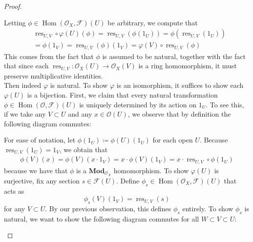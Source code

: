 \documentclass{article}
\newcommand{\fO}{\mathscr{O}}
\newcommand{\fF}{\mathscr{F}}
\DeclareMathOperator{\res}{res}
\DeclareMathOperator{\Hom}{Hom}
\newcommand{\Mod}{\mathbf{Mod}} %
\begin{document}
\begin{proof}
\begin{center}
    \end{center}
    Letting $\phi \in \Hom(\fO_X,\fF)(U)$ be arbitrary, we compute that
    \begin{align*}
        &\res_{U,V}\circ \varphi(U)(\phi)=\res_{U,V}(\phi(1_U))=\phi(\res_{U,V}(1_U))\\
        &=\phi(1_V)=\res_{U,V}(\phi)(1_V)=\varphi(V)\circ \res_{U,V}(\phi)
    \end{align*}
    This comes from the fact that $\phi$ is assumed to be natural, together with the fact that since each $\res_{U,V}:\fO_X(U)\to \fO_X(V)$ is a ring homomorphism, it must preserve multiplicative identities.\\
    Then indeed $\varphi$ is natural. To show $\varphi$ is an isomorphism, it suffices to show each $\varphi(U)$ is a bijection. First, we claim that every natural transformation $\phi\in \Hom(\fO,\fF)(U)$ is uniquely determined by its action on $1_U$. To see this, if we take any $V\subset U$ and any $x\in \fO(U)$, we observe that by definition the following diagram commutes:
    \begin{center}
    \end{center}
    For ease of notation, let $\phi(1_U)\coloneqq \phi(U)(1_U)$ for each open $U$. Because $\res_{U,V}(1_U)=1_V$, we obtain that
    \begin{align*}
        \phi(V)(x)=\phi(V)(x\cdot 1_V)=x\cdot \phi(V)(1_V)=x\cdot \res_{U,V}\circ \phi(1_U)
    \end{align*}
    because we have that $\phi$ is a $\Mod_{\fO_X}$ homomorphism. To show $\varphi(U)$ is surjective, fix any section $s\in \fF(U)$. Define $\phi_s\in \Hom(\fO_X,\fF)(U)$ that acts as
    \[
    \phi_s(V)(1_V)=\res_{U,V}(s)
    \]
    for any $V\subset U$. By our previous observation, this defines $\phi_s$ entirely. To show $\phi_s$ is natural, we want to show the following diagram commutes for all $W\subset V\subset U$:
    \begin{center}
        \begin{tikzcd}

\end{tikzcd}
\end{center}
\end{proof}
\end{document}
